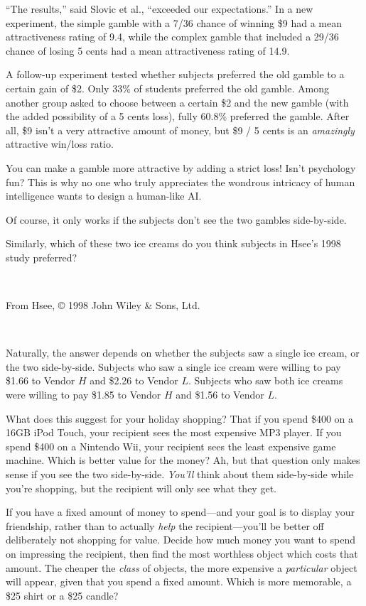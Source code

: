{
 ``The results,'' said Slovic et
al., ``exceeded our expectations.''
In a new experiment, the simple gamble with a 7/36 chance of winning
\$9 had a mean attractiveness rating of 9.4, while the complex gamble
that included a 29/36 chance of losing 5 cents had a mean
attractiveness rating of 14.9.}

{
 A follow-up experiment tested whether subjects preferred the old
gamble to a certain gain of \$2. Only 33\% of students preferred the
old gamble. Among another group asked to choose between a certain \$2
and the new gamble (with the added possibility of a 5 cents loss),
fully 60.8\% preferred the gamble. After all, \$9 isn't
a very attractive amount of money, but \$9 / 5 cents is an
\textit{amazingly} attractive win/loss ratio.}

{
 You can make a gamble more attractive by adding a strict loss!
Isn't psychology fun? This is why no one who truly
appreciates the wondrous intricacy of human intelligence wants to
design a human-like AI.}

{
 Of course, it only works if the subjects don't see
the two gambles side-by-side.}

{
 Similarly, which of these two ice creams do you think subjects in
Hsee's 1998 study preferred?}

{
 ~}


{\centering
{}
 \newline
 From Hsee, © 1998 John Wiley \& Sons, Ltd.
\par}


\bigskip

{
 ~}

{
 Naturally, the answer depends on whether the subjects saw a single
ice cream, or the two side-by-side. Subjects who saw a single ice cream
were willing to pay \$1.66 to Vendor $H$ and \$2.26 to Vendor $L$. Subjects
who saw both ice creams were willing to pay \$1.85 to Vendor $H$ and
\$1.56 to Vendor $L$.}

{
 What does this suggest for your holiday shopping? That if you
spend \$400 on a 16GB iPod Touch, your recipient sees the most
expensive MP3 player. If you spend \$400 on a Nintendo Wii, your
recipient sees the least expensive game machine. Which is better value
for the money? Ah, but that question only makes sense if you see the
two side-by-side. \textit{You'll} think about them
side-by-side while you're shopping, but the recipient
will only see what they get.}

{
 If you have a fixed amount of money to spend---and your goal is to
display your friendship, rather than to actually \textit{help} the
recipient---you'll be better off deliberately not
shopping for value. Decide how much money you want to spend on
impressing the recipient, then find the most worthless object which
costs that amount. The cheaper the \textit{class} of objects, the more
expensive a \textit{particular} object will appear, given that you
spend a fixed amount. Which is more memorable, a \$25 shirt or a \$25
candle?}

